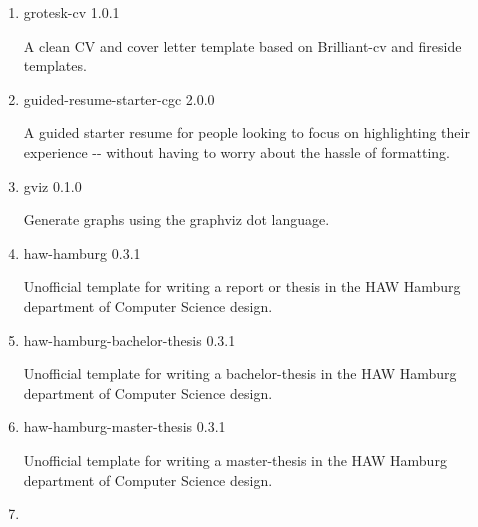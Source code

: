 \begin{enumerate}
  { gridlock } { 0.2.0 }

  Grid typesetting in Typst
\item
  \href{/universe/package/grotesk-cv/}{}


  { grotesk-cv } { 1.0.1 }

  A clean CV and cover letter template based on Brilliant-cv and
  fireside templates.
\item
  \href{/universe/package/guided-resume-starter-cgc/}{}


  { guided-resume-starter-cgc } { 2.0.0 }

  A guided starter resume for people looking to focus on highlighting
  their experience -\/- without having to worry about the hassle of
  formatting.
\item
  \href{/universe/package/gviz/}{}

  { gviz } { 0.1.0 }

  Generate graphs using the graphviz dot language.
\item
  \href{/universe/package/haw-hamburg/}{}

  { haw-hamburg } { 0.3.1 }

  Unofficial template for writing a report or thesis in the HAW Hamburg
  department of Computer Science design.
\item
  \href{/universe/package/haw-hamburg-bachelor-thesis/}{}


  { haw-hamburg-bachelor-thesis } { 0.3.1 }

  Unofficial template for writing a bachelor-thesis in the HAW Hamburg
  department of Computer Science design.
\item
  \href{/universe/package/haw-hamburg-master-thesis/}{}


  { haw-hamburg-master-thesis } { 0.3.1 }

  Unofficial template for writing a master-thesis in the HAW Hamburg
  department of Computer Science design.
\item
  \href{/universe/package/haw-hamburg-report/}{}


\end{enumerate}

